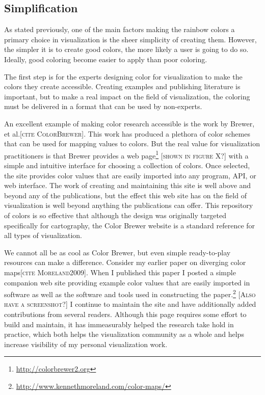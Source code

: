 \documentclass[letterpaper,twocolumn,fleqn]{article}
\newcommand{\etal}{et al.\xspace}
\newcommand{\fix}[1]{{\color{red}\textsc{[#1]}}}
\begin{document}
\subsection{Simplification}

\noindent
As stated previously, one of the main factors making the rainbow colors a
primary choice in visualization is the sheer simplicity of creating them.
However, the simpler it is to create good colors, the more likely a user is
going to do so. Ideally, good coloring become easier to apply than poor
coloring.

The first step is for the experts designing color for visualization to make
the colors they create accessible. Creating examples and publishing
literature is important, but to make a real impact on the field of
visualization, the coloring must be delivered in a format that can be used
by non-experts.

An excellent example of making color research accessible is the work by
Brewer, \etal\fix{cite ColorBrewer}. This work has produced a plethora of
color schemes that can be used for mapping values to colors. But the real
value for visualization practitioners is that Brewer provides a web
page\footnote{\url{http://colorbrewer2.org}} \fix{shown in figure X?} with
a simple and intuitive interface for choosing a collection of colors. Once
selected, the site provides color values that are easily imported into any
program, API, or web interface. The work of creating and maintaining this
site is well above and beyond any of the publications, but the effect this
web site has on the field of visualization is well beyond anything the
publications can offer. This repository of colors is so effective that
although the design was originally targeted specifically for cartography,
the Color Brewer website is a standard reference for all types of
visualization.

We cannot all be as cool as Color Brewer, but even simple ready-to-play
resources can make a difference. Consider my earlier paper on diverging
color maps\fix{cite Moreland2009}. When I published this paper I posted a
simple companion web site providing example color values that are easily
imported in software as well as the software and tools used in constructing
the paper.\footnote{\url{http://www.kennethmoreland.com/color-maps/}}
\fix{Also have a screenshot?} I continue to maintain the site and have
additionally added contributions from several readers. Although this page
requires some effort to build and maintain, it has immeasurably helped the
research take hold in practice, which both helps the visualization
community as a whole and helps increase visibility of my personal
visualization work.
\end{document}
